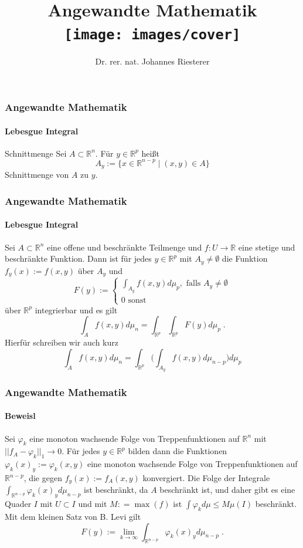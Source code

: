 \documentclass{beamer}
\begin{document}
\title[Angewandte Mathematik] %
{Angewandte Mathematik
\\
\texttt{[image: images/cover]}
}
\subtitle{}
\author[Dr. Johannes Riesterer] %
{Dr.  rer. nat. Johannes Riesterer}

\date[KPT 2004] %
{}

\subject{Angewandte Mathematik}



\frame{\titlepage}



\begin{frame}
    \frametitle{Angewandte Mathematik}
\framesubtitle{Lebesgue Integral}
\begin{block}{Schnittmenge}
Sei $ A \subset \mathbb{R}^n$. Für $ y \in \mathbb{R}^p$ heißt
$$ A_y :=  \biggl \{    x \in \mathbb{R}^{n-p}  \; | \;  (x,y) \in A \biggr \}$$  
Schnittmenge von $A$ zu $y$.
\end{block}
 \end{frame}



\begin{frame}
    \frametitle{Angewandte Mathematik}
\framesubtitle{Lebesgue Integral}
\begin{block}{}
Sei $A \subset \mathbb{R}^n$ eine offene und beschränkte Teilmenge und $f : U \to \mathbb{R}$  eine stetige und beschränkte Funktion.
Dann ist für jedes $ y \in \mathbb{R}^p$ mit $A_y \neq \emptyset$ die Funktion $f_y(x) := f(x,y)$ über $A_y$ und   
$$ F(y) := \begin{cases}   \int_{A_y} f(x,y) d \mu_{p}  , \text{ falls }  A_y \neq \emptyset 
\\ 0 \text{ sonst } \end{cases} $$
über $\mathbb{R}^{p}$ integrierbar und es gilt 
$$ \int_A f(x,y) d \mu_n = \int_{\mathbb{R}^p}  \int_{\mathbb{R}^p } F(y) d \mu_p \; .$$
 Hierfür schreiben wir auch kurz
$$ \int_A f(x,y) d \mu_n  = \int_{\mathbb{R}^{p} }  \biggl ( \int_{A_y} f(x,y)  d\mu_{n-p} \biggr ) d\mu_p$$
\end{block}
 \end{frame}



\begin{frame}
    \frametitle{Angewandte Mathematik}
\framesubtitle{Beweisl}
Sei  $\varphi_k$ eine monoton wachsende Folge von Treppenfunktionen auf $\mathbb{R}^n$ mit $|| f_A - \varphi_k ||_1 \to 0$.
Für jedes $y \in \mathbb{R}^p$ bilden dann die Funktionen $\varphi_k(x)_y := \varphi_k(x,y)$ eine monoton wachsende Folge von Treppenfunktionen auf $\mathbb{R}^{n-p}$, die gegen $f_y(x):= f_A(x,y)$ konvergiert. Die Folge der Integrale $\int_{\mathbb{R}^{n-p}} \varphi_k(x)_y d \mu_{n-p}$ ist beschränkt,  da $A$ beschränkt ist, und daher gibt es eine Quader $I$ mit $U \subset I$ und  mit $M : = \max (f)$  ist $\int \varphi_k d \mu \leq M \mu(I)$ beschränkt. Mit dem kleinen Satz von B. Levi
gilt
$$ F(y) := \lim_{k \to \infty} \int_{\mathbb{R}^{n-p}} \varphi_k(x)_y d \mu_{n-p} \; .$$
 \end{frame}
\end{document}

